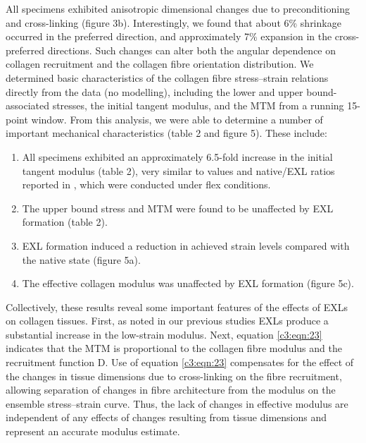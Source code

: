     All specimens exhibited anisotropic dimensional changes due to preconditioning and cross-linking (figure 3b). Interestingly, we found that about 6\% shrinkage occurred in the preferred direction, and approximately 7\% expansion in the cross-preferred directions. Such changes can alter both the angular dependence on collagen recruitment and the collagen fibre orientation distribution. We determined basic characteristics of the collagen fibre stress–strain relations directly from the data (no modelling), including the lower and upper bound-associated stresses, the initial tangent modulus, and the MTM from a running 15-point window. From this analysis, we were able to determine a number of important mechanical characteristics (table 2 and figure 5). These include:
        \begin{enumerate}
            \item All specimens exhibited an approximately 6.5-fold increase in the initial tangent modulus (table 2), very similar to values and native/EXL ratios reported in \cite{mirnajafi_effects_2005}, which were conducted under flex conditions.
            \item The upper bound stress and MTM were found to be unaffected by EXL formation (table 2).
            \item EXL formation induced a reduction in achieved strain levels compared with the native state (figure 5a).
            \item The effective collagen modulus was unaffected by EXL formation (figure 5c).
        \end{enumerate}
    Collectively, these results reveal some important features of the effects of EXLs on collagen tissues. First, as noted in our previous studies \cite{sacks_structural_2000,mirnajafi_effects_2005} EXLs produce a substantial increase in the low-strain modulus. Next, equation \ref{c3:eqn:23} indicates that the MTM is proportional to the collagen fibre modulus and the recruitment function D. Use of equation \ref{c3:eqn:23} compensates for the effect of the changes in tissue dimensions due to cross-linking on the fibre recruitment, allowing separation of changes in fibre architecture from the modulus on the ensemble stress–strain curve. Thus, the lack of changes in effective modulus are independent of any effects of changes resulting from tissue dimensions and represent an accurate modulus estimate.
    
    
    